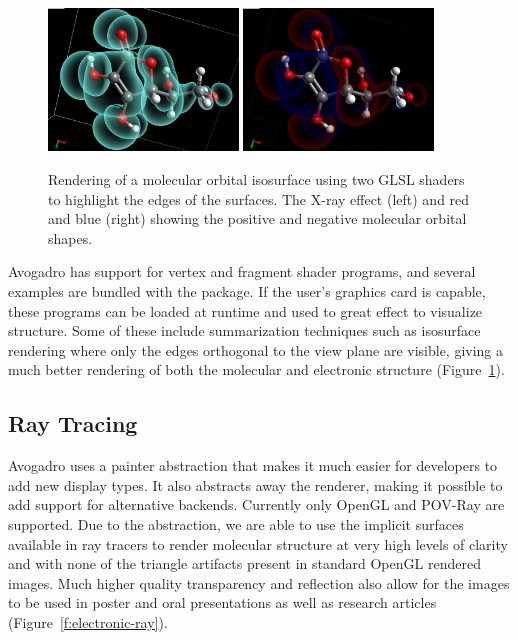 \documentclass[10pt]{bmc_article}
\newenvironment{bmcformat}{\begin{raggedright}
\baselineskip20pt\sloppy\setboolean{publ}{false}}{\end{raggedright}
\baselineskip20pt\sloppy}
\begin{document}
\begin{bmcformat}
\begin{figure}
  \begin{center}
    \includegraphics[width=0.45\textwidth]{images/avo-vitaminc-xray}
    \hspace*{0.1cm}
    \includegraphics[width=0.45\textwidth]{images/avo-vitaminc-cryos}
  \end{center}
  \caption{Rendering of a molecular orbital isosurface using two GLSL shaders to
  highlight the edges of the surfaces. The X-ray effect (left) and red and blue (right)
  showing the positive and negative molecular orbital shapes.}
 \label{f:electronic-glsl}
\end{figure}

Avogadro has support for vertex and fragment shader programs, and several
examples are bundled with the package. If the user's graphics card is capable,
these programs can be loaded at runtime and used to great effect to visualize
structure. Some of these include summarization techniques such as isosurface
rendering where only the edges orthogonal to the view plane are visible, giving
a much better rendering of both the molecular and electronic structure (Figure~\ref{f:electronic-glsl}).

\subsection{Ray Tracing}

Avogadro uses a painter abstraction that makes it much easier for developers to
add new display types. It also abstracts away the renderer, making it possible
to add support for alternative backends. Currently only OpenGL and POV-Ray are
supported. Due to the abstraction, we are able to use the implicit surfaces
available in ray tracers to render molecular structure at very high levels of
clarity and with none of the triangle artifacts present in standard OpenGL rendered
images. Much higher quality transparency and reflection also allow for the
images to be used in poster and oral presentations as well as research
articles (Figure~\ref{f:electronic-ray}).


\end{bmcformat}
\end{document}

